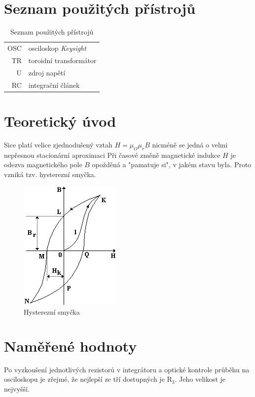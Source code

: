 \documentclass[a4paper,12pt]{article}   %
\begin{document}
\section{Seznam použitých přístrojů}
\label{chap:seznam_pristroju}
\begin{table}
  \begin{center}
    \begin{tabular}{rl}
      OSC & osciloskop \textit{Keysight}\\
      TR & toroidní transformátor\\
      U & zdroj napětí\\
      RC & integrační článek\\
    \end{tabular}
  \end{center}
  \caption{Seznam použitých přístrojů}
\end{table}


\section{Teoretický úvod}
\label{chap:teoreticky_uvod}
Sice platí velice zjednodušený vztah $H=\mu_O\mu_rB$ nicméně se jedná o velmi nepřesnou stacionární aproximaci Při časové změně magnetické indukce $H$ je odezva magnetického pole $B$ opožděná a "pamatuje si", v jakém stavu byla. Proto vzniká tzv. hysterezní smyčka.
\begin{figure}
  \centering
  \includegraphics[width=.3\textwidth]{hyst.png}
  \caption{Hysterezní smyčka}
\end{figure}


\section{Naměřené hodnoty}
\label{chap:namerene_hodnoty}
Po vyzkoušení jednotlivých rezistorů v integrátoru a optické kontrole průběhu na osciloskopu je zřejmé, že nejlepší ze tří dostupných je $\text{R}_\text{3}$. Jeho velikost je nejvyšší.
\end{document}
